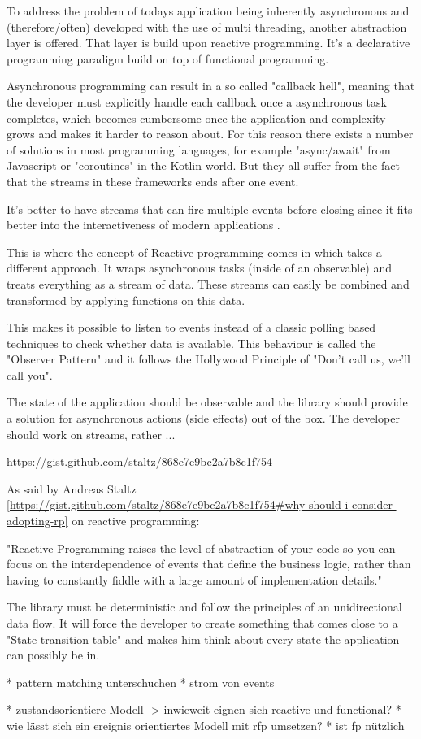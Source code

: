 To address the problem of todays application being inherently asynchronous and (therefore/often) developed 
with the use of multi threading, another abstraction layer is offered.
That layer is build upon reactive programming. It's a declarative programming paradigm
build on top of functional programming.

Asynchronous programming can result in a so called "callback hell", meaning that the developer must
explicitly handle each callback once a asynchronous task completes, which becomes cumbersome once the application 
and complexity grows and makes it harder to reason about. For this reason there exists a number of solutions
in most programming languages, for example "async/await" from Javascript or "coroutines" in the Kotlin world. 
But they all suffer from the fact that the streams in these frameworks ends after one event.

It's better to have streams that can fire multiple events before closing since it fits better into the
interactiveness of modern applications .

This is where the concept of Reactive programming comes in which takes a different approach. 
It wraps asynchronous tasks (inside of an observable) and treats everything as a stream of data.
These streams can easily be combined and transformed by applying functions on this data.

This makes it possible to listen to events instead of a classic polling based techniques to check
whether data is available. This behaviour is called the "Observer Pattern" and it follows the Hollywood Principle 
of "Don't call us, we'll call you".

The state of the application should be observable and the library should provide
a solution for asynchronous actions (side effects) out of the box. The developer
should work on streams, rather ...

https://gist.github.com/staltz/868e7e9bc2a7b8c1f754

As said by Andreas Staltz \ref{https://gist.github.com/staltz/868e7e9bc2a7b8c1f754#why-should-i-consider-adopting-rp} on
reactive programming:

"Reactive Programming raises the level of abstraction of your code so you can 
focus on the interdependence of events that define the business logic, 
rather than having to constantly fiddle with a large amount of implementation details."

The library must be deterministic and follow the principles of an unidirectional data flow. 
It will force the developer to create something that comes close to a "State transition table" and makes him 
think about every state the application can possibly be in.


* pattern matching unterschuchen
* strom von events

* zustandsorientiere Modell -> inwieweit eignen sich reactive und functional?
* wie lässt sich ein ereignis orientiertes Modell mit rfp umsetzen?
* ist fp nützlich